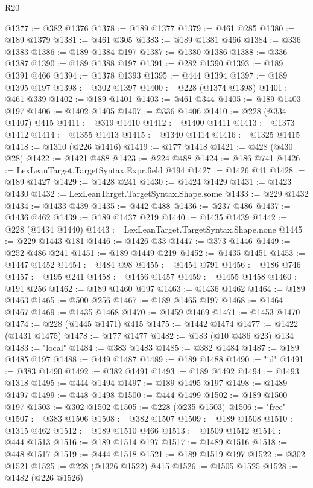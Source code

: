 \begin{lexlean}{R20}
\begin{coremodule}
@1377 := @382 @1376
@1378 := @189 @1377
@1379 := @461 @285
@1380 := @189 @1379
@1381 := @461 @305
@1383 := @189 @1381 @466
@1384 := @336 @1383
@1386 := @189 @1384 @197
@1387 := @1380 @1386
@1388 := @336 @1387
@1390 := @189 @1388 @197
@1391 := @282 @1390
@1393 := @189 @1391 @466
@1394 := @1378 @1393
@1395 := @444 @1394
@1397 := @189 @1395 @197
@1398 := @302 @1397
@1400 := @228 (@1374 @1398)
@1401 := @461 @339
@1402 := @189 @1401
@1403 := @461 @344
@1405 := @189 @1403 @197
@1406 := @1402 @1405
@1407 := @336 @1406
@1410 := @228 (@334 @1407) @415
@1411 := @319 @1410
@1412 := @1400 @1411
@1413 := @1373 @1412
@1414 := @1355 @1413
@1415 := @1340 @1414
@1416 := @1325 @1415
@1418 := @1310 (@226 @1416)
@1419 := @177 @1418
@1421 := @428 (@430 @28)
@1422 := @1421 @488
@1423 := @224 @488
@1424 := @186 @741
@1426 := LexLeanTarget.TargetSyntax.Expr.field @194
@1427 := @1426 @41
@1428 := @189 @1427
@1429 := @1428 @241
@1430 := @1424 @1429
@1431 := @1423 @1430
@1432 := LexLeanTarget.TargetSyntax.Shape.some
@1433 := @229 @1432
@1434 := @1433 @439
@1435 := @442 @488
@1436 := @237 @486
@1437 := @1436 @462
@1439 := @189 @1437 @219
@1440 := @1435 @1439
@1442 := @228 (@1434 @1440)
@1443 := LexLeanTarget.TargetSyntax.Shape.none
@1445 := @229 @1443 @181
@1446 := @1426 @33
@1447 := @373 @1446
@1449 := @252 @486 @241
@1451 := @189 @1449 @219
@1452 := @1435 @1451
@1453 := @1447 @1452
@1454 := @484 @98
@1455 := @1454 @791
@1456 := @186 @746
@1457 := @195 @241
@1458 := @1456 @1457
@1459 := @1455 @1458
@1460 := @191 @256
@1462 := @189 @1460 @197
@1463 := @1436 @1462
@1464 := @189 @1463
@1465 := @500 @256
@1467 := @189 @1465 @197
@1468 := @1464 @1467
@1469 := @1435 @1468
@1470 := @1459 @1469
@1471 := @1453 @1470
@1474 := @228 (@1445 @1471) @415
@1475 := @1442 @1474
@1477 := @1422 (@1431 @1475)
@1478 := @177 @1477
@1482 := @183 (@10 @486 @23) @134
@1483 := "local"
@1484 := @383 @1483
@1485 := @382 @1484
@1487 := @189 @1485 @197
@1488 := @449 @1487
@1489 := @189 @1488
@1490 := "id"
@1491 := @383 @1490
@1492 := @382 @1491
@1493 := @189 @1492
@1494 := @1493 @1318
@1495 := @444 @1494
@1497 := @189 @1495 @197
@1498 := @1489 @1497
@1499 := @448 @1498
@1500 := @444 @1499
@1502 := @189 @1500 @197
@1503 := @302 @1502
@1505 := @228 (@235 @1503)
@1506 := "free"
@1507 := @383 @1506
@1508 := @382 @1507
@1509 := @189 @1508
@1510 := @1315 @462
@1512 := @189 @1510 @466
@1513 := @1509 @1512
@1514 := @444 @1513
@1516 := @189 @1514 @197
@1517 := @1489 @1516
@1518 := @448 @1517
@1519 := @444 @1518
@1521 := @189 @1519 @197
@1522 := @302 @1521
@1525 := @228 (@1326 @1522) @415
@1526 := @1505 @1525
@1528 := @1482 (@226 @1526)

\end{coremodule}
\end{lexlean}
